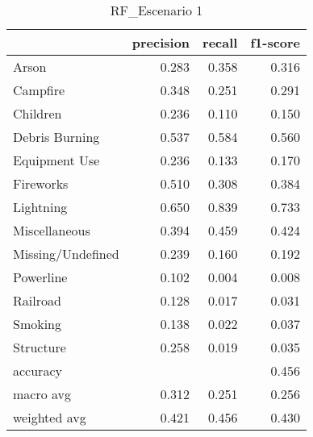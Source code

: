 \begin{table}
\centering
\caption{RF_Escenario 1}
\label{tab:Reporte de clasificación para el Escenario 1 utilizando Random Forest}
\begin{tabular}{lrrr}
\toprule
{} &  precision &  recall &  f1-score \\
\midrule
Arson             &      0.283 &   0.358 &     0.316 \\
Campfire          &      0.348 &   0.251 &     0.291 \\
Children          &      0.236 &   0.110 &     0.150 \\
Debris Burning    &      0.537 &   0.584 &     0.560 \\
Equipment Use     &      0.236 &   0.133 &     0.170 \\
Fireworks         &      0.510 &   0.308 &     0.384 \\
Lightning         &      0.650 &   0.839 &     0.733 \\
Miscellaneous     &      0.394 &   0.459 &     0.424 \\
Missing/Undefined &      0.239 &   0.160 &     0.192 \\
Powerline         &      0.102 &   0.004 &     0.008 \\
Railroad          &      0.128 &   0.017 &     0.031 \\
Smoking           &      0.138 &   0.022 &     0.037 \\
Structure         &      0.258 &   0.019 &     0.035 \\
accuracy          &            &         &     0.456 \\
macro avg         &      0.312 &   0.251 &     0.256 \\
weighted avg      &      0.421 &   0.456 &     0.430 \\
\bottomrule
\end{tabular}
\end{table}
